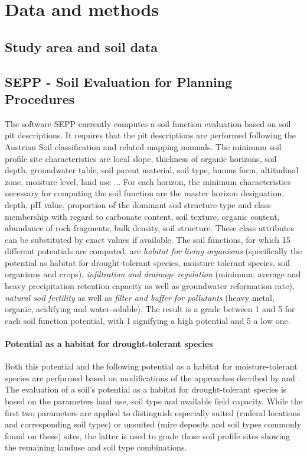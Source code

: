 \documentclass[preprint,12pt,authoryear]{elsarticle}
\begin{document}
\section{Data and methods}

\subsection{Study area and soil data}

\subsection{SEPP - Soil Evaluation for Planning Procedures}
The software SEPP currently computes a soil function evaluation based on soil pit descriptions. It requires that the pit descriptions are performed following the Austrian Soil classification  \citep{Nestroy2000,Nestroy2011} and related mapping manuals. The minimum  soil profile site characteristics are local slope, thickness of organic horizons, soil depth, groundwater table, soil parent material, soil type, humus form, altitudinal zone, moisture level, land use ... For each horizon, the minimum characteristics necessary for computing the soil function are the master horizon designation, depth, pH value, proportion of the dominant soil structure type and class membership with regard to carbonate content, soil texture, organic content, abundance of rock fragments, bulk density, soil structure. These class attributes can be substituted by exact values if available. The soil functions, for which 15 different potentials are computed, are  \emph{habitat for living organisms} (specifically the potential as habitat for drought-tolerant species, moisture tolerant species, soil organisms and crops),  \emph{infiltration and drainage regulation} (minimum, average and heavy precipitation retention capacity as well as groundwater reformation rate), \emph{natural soil fertility} as well as \emph{filter and buffer for pollutants} (heavy metal, organic, acidifying and water-soluble). The result is a grade between 1 and 5 for each soil function potential, with 1 signifying a high potential and 5 a low one.

\paragraph{Potential as a habitat for drought-tolerant species} 
Both this potential and the following potential as a habitat for moisture-tolerant species are performed based on modifications of the approaches decribed by \cite{BAYGLA2003} and \cite{Lehmann2008}.
The evaluation of a soil's potential  as a habitat for drought-tolerant species is based on the parameters land use, soil type and available field capacity. While the first two parameters are applied to distinguish especially suited (ruderal locations and corresponding soil types) or unsuited (mire deposits and soil types commonly found on these) sites, the latter is used to grade those soil profile sites showing the remaining landuse and soil type combinations. 
\end{document}
